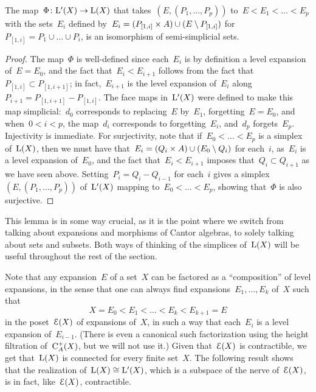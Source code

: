 \begin{lem}\label{lem:corr}
The map~$\Phi\colon\mathrm{L}'(X)\to \mathrm{L}(X)$ that takes~$(E,(P_1,\dots,P_p))$ to~$E<E_1<\dots<E_p$ with the sets~$E_i$ defined by~\hbox{$E_i=(P_{[1,i]}\times A)\cup (E\setminus P_{[1,i]})$} for~$P_{[1,i]}=P_1\cup\dots\cup P_i$, is an isomorphism of semi-simplicial sets. 
\end{lem}

\begin{proof}
The map~$\Phi$ is well-defined since each~$E_i$ is by definition a level expansion of~$E=E_0$, and the fact that~$E_i<E_{i+1}$ follows from the fact that~$P_{[1,i]}\subset P_{[1,i+1]}$; in fact,~$E_{i+1}$ is the level expansion of~$E_i$ along~\hbox{$P_{i+1}=P_{[1,i+1]}\minus P_{[1,i]}$}. The face maps in~$\mathrm{L}'(X)$ were defined to make this map simplicial:~$d_0$ corresponds to replacing~$E$ by~$E_1$, forgetting~$E=E_0$, and when~$0<i<p$, the map~$d_i$ corresponds to forgetting~$E_i$, and~$d_p$ forgets~$E_p$. 
Injectivity is immediate. For surjectivity, note that if~$E_0<\dots<E_p$ is a simplex of~$\mathrm{L}(X)$, then we must have that~$E_i=(Q_{i}\times A)\cup(E_0\setminus Q_{i})$ for each~$i$, as~$E_i$ is a level expansion of~$E_0$, and the fact that~$E_i<E_{i+1}$ imposes that~$Q_{i}\subset Q_{i+1}$ as we have seen above. Setting~$P_i=Q_{i}\minus Q_{i-1}$ for each~$i$ gives a simplex~$ (E,(P_1,\dots,P_p))$ of~$\mathrm{L}'(X)$ mapping to~$E_0<\dots<E_p$, showing that~$\Phi$ is also surjective. 
\end{proof}


This lemma is in some way crucial, as it is the point where we switch from talking about expansions and morphisms of Cantor algebras, to solely talking about sets and subsets. 
Both ways of thinking of the simplices of~$\mathrm{L}(X)$ will be useful throughout the rest of the section. 

Note that any expansion~$E$ of a set~$X$ can be factored as a ``composition'' of level expansions, in the sense that one can always find expansions~$E_1,\dots,E_k$ of~$X$ such that 
$$X=E_0< E_1< \dots<  E_k<  E_{k+1}=E$$
in the poset~$\mathcal{E}(X)$ of expansions of~$X$, in such a way that each~$E_i$ is a level expansion of~$E_{i-1}$. 
(There is even a canonical such factorization using the height filtration of~$\mathrm{C}_A^+(X)$, but we will not use it.) 
Given that~$\mathcal{E}(X)$ is contractible, we get that~$\mathrm{L}(X)$ is connected for every finite set~$X$. The following result shows that the realization of~$\mathrm{L}(X)\cong \mathrm{L}'(X)$, which is a subspace of the nerve of~$\mathcal{E}(X)$, is in fact,  like~$\mathcal{E}(X)$,  contractible. 



